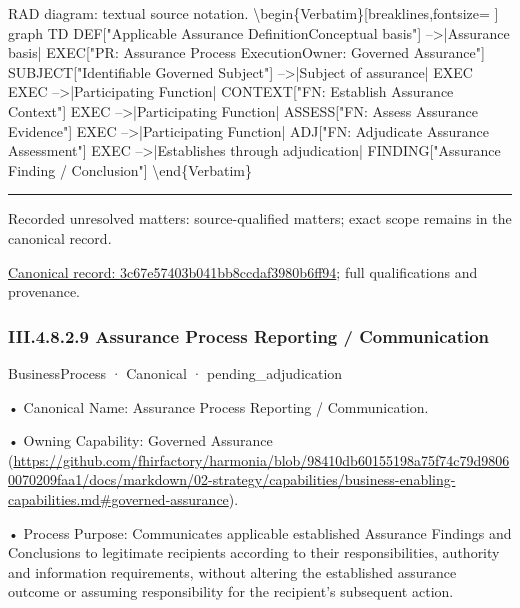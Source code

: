 RAD diagram: textual source notation.
\textbackslash{}begin\{Verbatim\}[breaklines,fontsize=
]
graph TD
    DEF["Applicable Assurance Definition\newline{}Conceptual basis"] -->|Assurance basis| EXEC["PR: Assurance Process Execution\newline{}Owner: Governed Assurance"]
    SUBJECT["Identifiable Governed Subject"] -->|Subject of assurance| EXEC
    EXEC -->|Participating Function| CONTEXT["FN: Establish Assurance Context"]
    EXEC -->|Participating Function| ASSESS["FN: Assess Assurance Evidence"]
    EXEC -->|Participating Function| ADJ["FN: Adjudicate Assurance Assessment"]
    EXEC -->|Establishes through adjudication| FINDING["Assurance Finding / Conclusion"]
\textbackslash{}end\{Verbatim\}



\medskip\hrule\medskip

{\small Recorded unresolved matters: source-qualified matters; exact scope remains in the canonical record.}\par
{\footnotesize \href{../../../../../../../../continuum/business/business-process/3c67e57403b041bb8ccdaf3980b6ff94.md}{Canonical record: 3c67e57403b041bb8ccdaf3980b6ff94}; full qualifications and provenance.}\par
\subsubsection*{III.4.8.2.9 Assurance Process Reporting / Communication}
\label{navigation:III.4.8.2.9}

\label{element:2fc0b626577b43feb050bcd91ac2b0a9}
{\small BusinessProcess · Canonical · pending\_adjudication}\par

•
Canonical Name: Assurance Process Reporting / Communication.



•
Owning Capability: Governed Assurance (\url{https://github.com/fhirfactory/harmonia/blob/98410db60155198a75f74c79d98060070209faa1/docs/markdown/02-strategy/capabilities/business-enabling-capabilities.md#governed-assurance}).



•
Process Purpose: Communicates applicable established Assurance Findings and Conclusions to legitimate recipients according to their responsibilities, authority and information requirements, without altering the established assurance outcome or assuming responsibility for the recipient's subsequent action.



